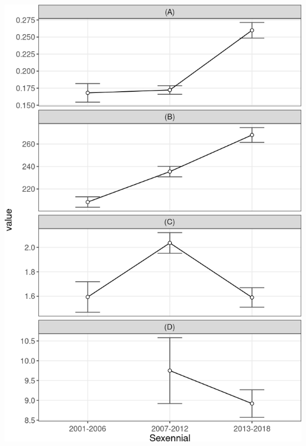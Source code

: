 \documentclass[10pt,landscape,a3paper]{article}
\begin{document}
\begin{center}\includegraphics{img/modelling/aa-eda-ts-18} \end{center}
\end{document}
